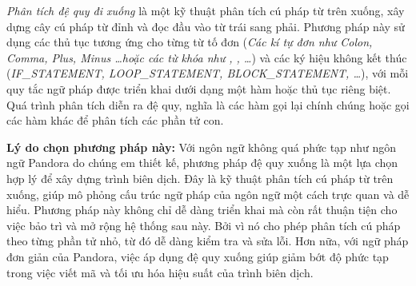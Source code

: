 \textit{Phân tích đệ quy đi xuống} là một kỹ thuật phân tích cú pháp từ trên xuống, xây dựng cây cú pháp từ đỉnh và đọc đầu vào từ trái sang phải. Phương pháp này sử dụng các thủ tục tương ứng cho từng từ tố đơn (\textit{\emph{Các kí tự đơn như} Colon, Comma, Plus, Minus \dots \emph{hoặc các từ khóa như} , , \dots }) và các ký hiệu không kết thúc (\textit{IF\_STATEMENT, LOOP\_STATEMENT, BLOCK\_STATEMENT, \dots}), với mỗi \\quy tắc ngữ pháp được triển khai dưới dạng một hàm hoặc thủ tục riêng biệt. Quá trình phân tích diễn ra đệ quy, nghĩa là các hàm gọi lại chính chúng hoặc gọi các hàm khác để phân tích các phần tử con.

\textbf{Lý do chọn phương pháp này:} Với ngôn ngữ không quá phức tạp như ngôn ngữ Pandora do chúng em thiết kế, phương pháp đệ quy xuống là một lựa chọn hợp lý để xây dựng trình biên dịch. Đây là kỹ thuật phân tích cú pháp từ trên xuống, giúp mô phỏng cấu trúc ngữ pháp của ngôn ngữ một cách trực quan và dễ hiểu. Phương pháp này không chỉ dễ dàng triển khai mà còn rất thuận tiện cho việc bảo trì và mở rộng hệ thống sau này. Bởi vì nó cho phép phân tích cú pháp theo từng phần tử nhỏ, từ đó dễ dàng kiểm tra và sửa lỗi. Hơn nữa, với ngữ pháp đơn giản của Pandora, việc áp dụng đệ quy xuống giúp giảm bớt độ phức tạp trong việc viết mã và tối ưu hóa hiệu suất của trình biên dịch.
